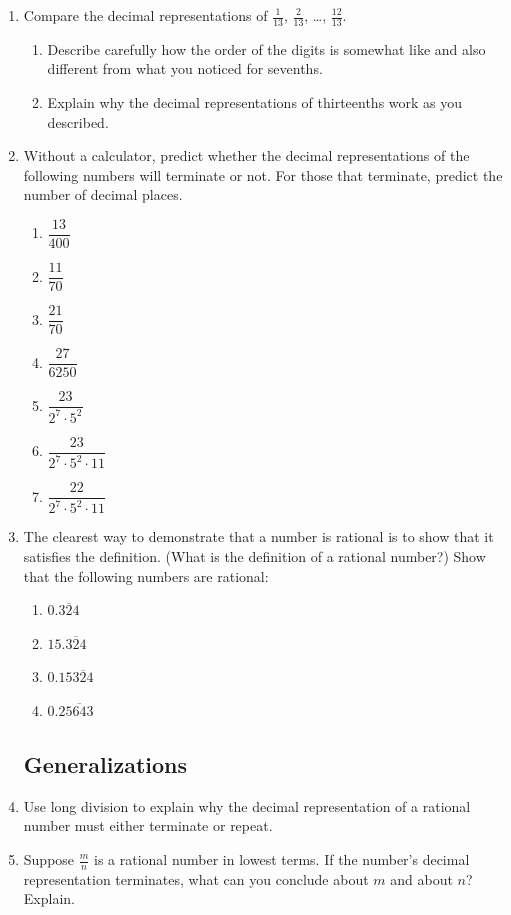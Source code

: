 \begin{problems}
\begin{enumerate}
\item 
Compare the decimal representations of $\frac{1}{13}$, $\frac{2}{13}$, \dots,  $\frac{12}{13}$.  
\begin{enumerate}  
\item Describe carefully how the order of the digits is somewhat like and also different from what you noticed for sevenths.  
\item Explain why the decimal representations of thirteenths work as you described.
\end{enumerate}

\item Without a calculator, predict whether the decimal representations of the following numbers will terminate or not.  For those that terminate, predict the number of decimal places.  
\begin{enumerate}
\item $\dfrac{13}{400}$
\item $\dfrac{11}{70}$
\item $\dfrac{21}{70}$
\item $\dfrac{27}{6250}$
\item $\dfrac{23}{2^7\cdot 5^2}$
\item $\dfrac{23}{2^7\cdot 5^2\cdot 11}$
\item $\dfrac{22}{2^7\cdot 5^2\cdot 11}$
\end{enumerate}

\item The clearest way to demonstrate that a number is rational is to show that it satisfies the definition.  (What is the definition of a rational number?)  Show that the following numbers are rational:  
\begin{enumerate}
\item $0.\overline{324}$
\item $15.\overline{324}$
\item $0.15\overline{324}$
\item $0.2\overline{5643}$
\end{enumerate}


\subsection*{Generalizations}
\item Use long division to explain why the decimal representation of a rational number must either terminate or repeat.

\item Suppose $\frac{m}{n}$ is a rational number in lowest terms.  If the number's decimal representation terminates, what can you conclude about $m$ and about $n$?  Explain.  


\end{enumerate}
\end{problems}
